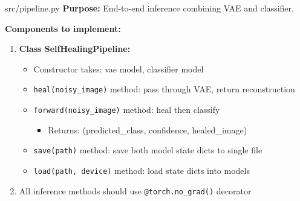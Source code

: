 \documentclass[11pt,a4paper]{article}
\begin{document}
\begin{filebox}{src/pipeline.py}
\textbf{Purpose:} End-to-end inference combining VAE and classifier.

\textbf{Components to implement:}
\begin{enumerate}[noitemsep]
    \item \textbf{Class SelfHealingPipeline:}
    \begin{itemize}[noitemsep]
        \item Constructor takes: vae model, classifier model
        \item \texttt{heal(noisy\_image)} method: pass through VAE, return reconstruction
        \item \texttt{forward(noisy\_image)} method: heal then classify
        \begin{itemize}[noitemsep]
            \item Returns: (predicted\_class, confidence, healed\_image)
        \end{itemize}
        \item \texttt{save(path)} method: save both model state dicts to single file
        \item \texttt{load(path, device)} method: load state dicts into models
    \end{itemize}
    \item All inference methods should use \texttt{@torch.no\_grad()} decorator
\end{enumerate}
\end{filebox}

\vspace{0.5cm}
\end{document}
